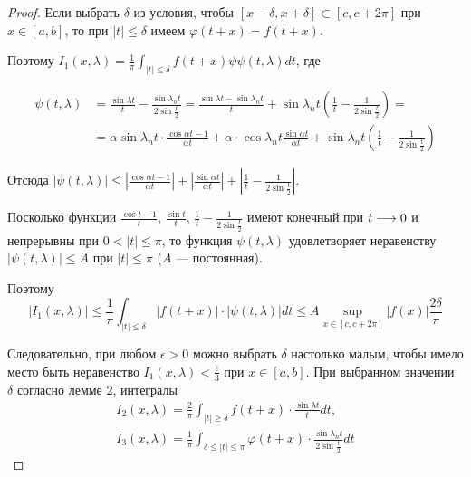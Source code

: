 \begin{proof}
    Если выбрать $\delta$ из условия, чтобы $[x - \delta, x + \delta] \subset
    [c, c + 2\pi]$ при $x \in [a, b]$, то при $|t| \leq \delta$ имеем
    $\varphi(t + x) = f(t + x)$.

    Поэтому $I_1(x, \lambda) = \frac{1}{\pi} \int_{|t| \leq \delta}
    f(t + x) \psi \psi(t, \lambda) dt$, где

    \begin{align*}
        \psi(t, \lambda) &= \frac{\sin \lambda t}{t} - 
        \frac{\sin \lambda_n t}{2 \sin \frac{t}{2}} =
        \frac{\sin \lambda t - \sin \lambda_n t}{t} + 
        \sin \lambda_n t \left( \frac{1}{t} - \frac{1}{2\sin \frac{t}{2}} \right) = \\
        &= \alpha \sin \lambda_n t \cdot \frac{\cos \alpha t - 1}{\alpha t} +
        \alpha \cdot \cos \lambda_n t \frac{\sin \alpha t}{\alpha t} +
        \sin \lambda_n t \left( \frac{1}{t} - \frac{1}{2 \sin \frac{t}{2}} \right)
    \end{align*}

    Отсюда $|\psi(t, \lambda)| \leq \left| \frac{\cos \alpha t - 1}{\alpha t} \right| +
    \left| \frac{\sin \alpha t}{\alpha t} \right| + 
    \left| \frac{1}{t} - \frac{1}{2 \sin \frac{t}{2}} \right|$.

    Посколько функции $\frac{\cos t - 1}{t}$, $\frac{\sin t}{t}$,
    $\frac{1}{t} - \frac{1}{2 \sin \frac{t}{2}}$ имеют конечный при 
    $t \underset{}{\longrightarrow} 0$ и непрерывны при $0 < |t| \leq \pi$, то
    функция $\psi(t, \lambda)$ удовлетворяет неравенству $|\psi(t, \lambda)| \leq A$
    при $|t| \leq \pi$ ($A$ --- постоянная).

    Поэтому
    \[ 
        |I_1(x, \lambda)| \leq \frac{1}{\pi} \int_{|t| \leq \delta}
            |f(t + x)| \cdot |\psi(t, \lambda)| dt \leq
        A \sup_{x \in [c, c + 2 \pi]} |f(x)| \frac{2 \delta}{\pi}
    \]

    Следовательно, при любом $\epsilon > 0$ можно выбрать $\delta$ настолько
    малым, чтобы имело место быть неравенство $I_1(x, \lambda) < \frac{\epsilon}{3}$
    при $x \in [a, b]$. При выбранном значении $\delta$ согласно лемме 2,
    интегралы
    \begin{align*}
        I_2(x, \lambda) = \frac{2}{\pi} \int_{|t| \geq \delta}
            f(t + x) \cdot \frac{\sin \lambda t}{t} dt, \\
        I_3(x, \lambda) = \frac{1}{\pi} \int_{\delta \leq |t| \leq \pi}
            \varphi(t + x) \cdot \frac{\sin \lambda_n t}{2 \sin \frac{t}{2}} dt
    \end{align*}


\end{proof}
